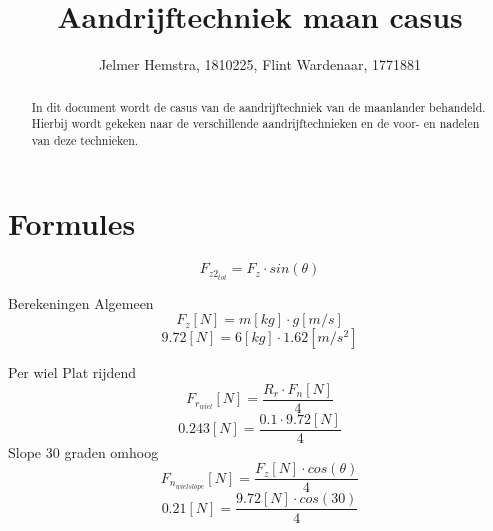 \documentclass{article}
\title{Aandrijftechniek maan casus}
\author{Jelmer Hemstra, 1810225, Flint Wardenaar, 1771881}
\begin{document}
    \maketitle

    \begin{abstract}
        In dit document wordt de casus van de aandrijftechniek van de maanlander behandeld. Hierbij wordt gekeken naar de verschillende aandrijftechnieken en de voor- en nadelen van deze technieken.

    \end{abstract}


\section{Formules}
    $$
        F_{z2_{tot}} = F_z \cdot sin(\theta)
    $$

    Berekeningen
    Algemeen
    $$
        F_z [N] = m[kg] \cdot g[m/s]
    $$$$
        9.72 [N] = 6 [kg] \cdot 1.62[m/s^2]
    $$

    Per wiel
    Plat rijdend
    $$
        F_{r_{wiel}}[N]= \frac {R_r \cdot F_n[N]}{4}
    $$
    $$
        0.243 [N]=  \frac {0.1 \cdot 9.72[N]}{4}
    $$
    Slope 30 graden omhoog
    $$
        F_{n_{wielslope}} [N] = \frac {F_z [N] \cdot cos(\theta)}{4}
    $$
    $$
        0.21 [N] = \frac {9.72[N] \cdot cos(30)}{4}
    $$
\end{document}
